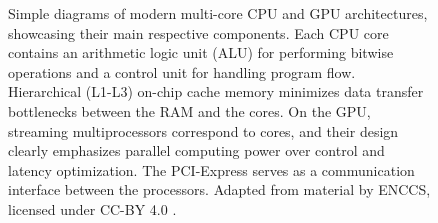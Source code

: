 \documentclass[english,12pt,a4paper,pdftex,sci,utf8]{aaltothesis}
\begin{document}
\begin{figure}[htbp]
  \centering
  \caption{Simple diagrams of modern multi-core CPU and GPU architectures, showcasing their main respective components. Each CPU core contains an arithmetic logic unit (ALU) for performing bitwise operations and a control unit for handling program flow. Hierarchical (L1-L3) on-chip cache memory minimizes data transfer bottlenecks between the RAM and the cores. On the GPU, streaming multiprocessors correspond to cores, and their design clearly emphasizes parallel computing power over control and latency optimization. The PCI-Express serves as a communication interface between the processors. Adapted from material by ENCCS, licensed under CC-BY 4.0 \cite{enccs2025gpu}.}
  \label{fig:cpu-gpu-architecture}
\end{figure}
\end{document}
